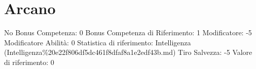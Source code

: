 \section{Arcano}\label{arcano}

\begin{description}
\tightlist
\item[Tags: ABI]
No Bonus Competenza: 0 Bonus Competenza di Riferimento: 1 Modificatore:
-5 Modificatore Abilità: 0 Statistica di riferimento: Intelligenza
(Intelligenza\%20e22f806df5dc461f8dfaf8a1e2edf43b.md) Tiro Salvezza: -5
Valore di riferimento: 0
\end{description}
